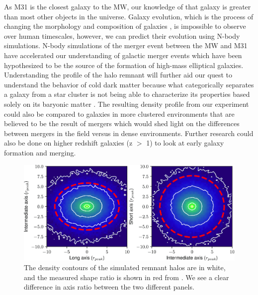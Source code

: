 \documentclass[linenumbers, twocolumn]{aastex631}
\begin{document}
As M31 is the closest galaxy to the MW, our knowledge of that galaxy is greater than most other objects in the universe. Galaxy evolution, which is the process of changing the morphology and composition of galaxies \citep{2004galaxyevolutiondef}, is impossible to observe over human timescales, however, we can predict their evolution using N-body simulations.
N-body simulations of the merger event between the MW and M31 have accelerated our understanding of galactic merger events which have been hypothesized to be the source of the formation of high-mass elliptical galaxies. 
Understanding the profile of the halo remnant will further aid our quest to understand the behavior of cold dark matter because what categorically separates a galaxy from a star cluster is not being able to characterize its properties based solely on its baryonic matter \citep{2012Galaxydef}.
The resulting density profile from our experiment could also be compared to galaxies in more clustered environments that are believed to be the result of mergers which would shed light on the differences between mergers in the field versus in dense environments.
Further research could also be done on higher redshift galaxies (z $>$ 1) to look at early galaxy formation and merging.
\begin{figure}[ht]
    \centering
    \includegraphics[scale=0.5]{figures/drakos_fig_6.png}
    \caption{The density contours of the simulated remnant halos are in white, and the measured shape ratio is shown in red from \cite{2019drakos}. We see a clear difference in axis ratio between the two different panels.}
    \label{fig:drakos}
\end{figure}
\end{document}
